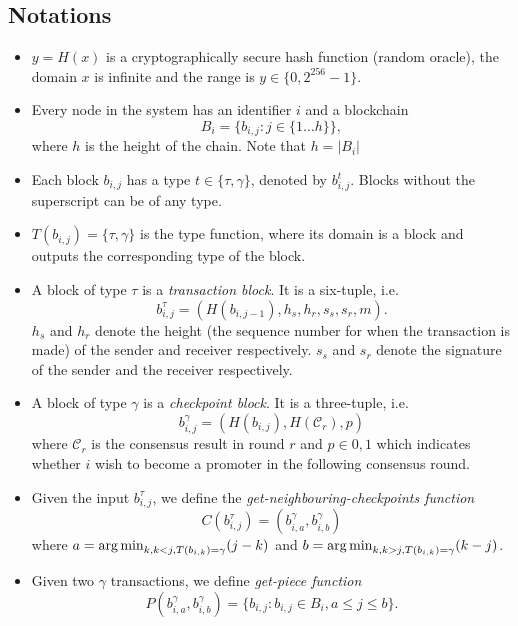 \subsection{Notations}
\begin{itemize}

\item $y = H(x)$ is a cryptographically secure hash function (random oracle),
  the domain $x$ is infinite and the range is $y \in \{0, 2^{256}-1\}$.

\item Every node in the system has an identifier $i$ and a blockchain
  $$B_i = \{b_{i,j} : j \in \{1 \dots h\} \},$$
  where $h$ is the height of the chain. Note that $h = |B_i|$

\item Each block $b_{i,j}$ has a type $t \in \{ \tau, \gamma \}$, denoted by
  $b^t_{i,j}$. Blocks without the superscript can be of any type.

\item $T(b_{i, j}) = \{ \tau, \gamma \}$ is the type function, where its domain
  is a block and outputs the corresponding type of the block.

\item A block of type $\tau$ is a \emph{transaction block}. It is a six-tuple,
  i.e. $$b^\tau_{i,j} = (H(b_{i,j-1}), h_s, h_r, s_s, s_r, m).$$ $h_s$ and $h_r$
  denote the height (the sequence number for when the transaction is made) of
  the sender and receiver respectively. $s_s$ and $s_r$ denote the signature of
  the sender and the receiver respectively.

\item A block of type $\gamma$ is a \emph{checkpoint block}. It is a
  three-tuple, i.e.
  $$b^\gamma_{i,j} = (H(b_{i,j}), H(\mathcal{C}_r), p)$$
  where $\mathcal{C}_r$ is the consensus result in round $r$ and $p \in {0,1}$
  which indicates whether $i$ wish to become a promoter in the following
  consensus round.

\item Given the input $b^\tau_{i,j}$, we define the
  \emph{get-neighbouring-checkpoints function}
  $$C(b^\tau_{i,j}) = (b^\gamma_{i,a}, b^\gamma_{i,b})$$
  where $a = \operatorname*{arg\,min}_{k, k < j, T(b_{i,k}) = \gamma}(j - k)$ and $b =
  \operatorname*{arg\,min}_{k, k > j, T(b_{i,k}) = \gamma}(k - j)$.

\item Given two $\gamma$ transactions, we define \emph{get-piece function}
  $$P(b^\gamma_{i,a}, b^\gamma_{i,b}) = \{b_{i,j} : b_{i,j} \in B_i, a \le j \le
  b\}.$$


\end{itemize}
